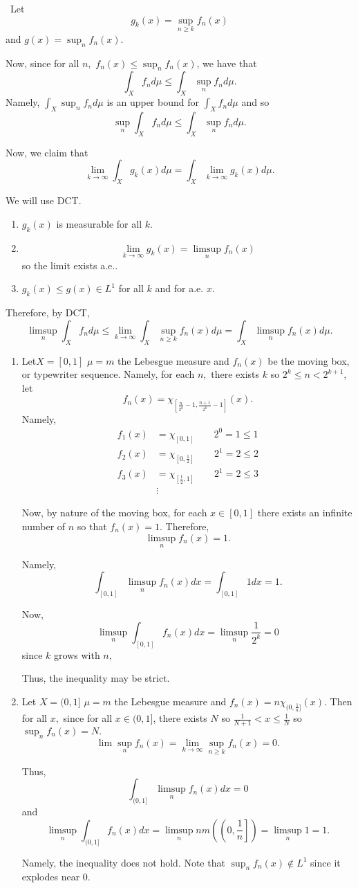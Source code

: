 \documentclass[12pt]{Qual}
\begin{document}
\begin{solution}$\,$
Let $$g_k(x)=\sup_{n\ge k}f_n(x)$$ and $g(x)=\sup_nf_n(x)$.

Now, since for all $n,$ $f_n(x)\le\sup_nf_n(x)$, we have that $$\int_Xf_nd\mu\le\int_X\sup_nf_nd\mu.$$ Namely, $\displaystyle \int_X\sup_nf_nd\mu$ is an upper bound for $\displaystyle \int_Xf_nd\mu$ and so $$\sup_n\int_Xf_nd\mu\le \int_X\sup_nf_nd\mu.$$

Now, we claim that $$\lim_{k\to\infty}\int_Xg_k(x)d\mu=\int_X\lim_{k\to\infty}g_k(x)d\mu.$$

We will use DCT. \begin{enumerate}
    \item $g_k(x)$ is measurable for all $k.$
    \item $$\lim_{k\to\infty}g_k(x)=\limsup_nf_n(x)$$ so the limit exists a.e..
    \item $g_k(x)\le g(x)\in L^1$ for all $k$ and for a.e. $x$.
\end{enumerate}

Therefore, by DCT, $$\limsup_n\int_Xf_nd\mu\le\lim_{k\to\infty}\int_X\sup_{n\ge k}f_n(x)d\mu=\int_X\limsup_nf_n(x)d\mu.$$

\begin{enumerate}[label=(\alph*)]
    \item Let$X=[0,1]$ $\mu=m$ the Lebesgue measure and $f_n(x)$ be the moving box, or typewriter sequence. Namely, for each $n,$ there exists $k$ so $2^k\le n<2^{k+1}$, let $$f_n(x)=\chi_{[\frac{n}{2^k}-1,\frac{n+1}{2^k}-1]}(x).$$ Namely, \begin{align*}
        f_1(x)&=\chi_{[0,1]}\qquad 2^0=1\le 1\\
        f_2(x)&=\chi_{[0,\frac{1}{2}]}\qquad 2^1=2\le 2\\
        f_3(x)&=\chi_{[\frac{1}{2},1]}\qquad 2^1=2\le 3\\
        &\vdots
    \end{align*}

    Now, by nature of the moving box, for each $x\in[0,1]$ there exists an infinite number of $n$ so that $f_n(x)=1$. Therefore, $$\limsup_nf_n(x)=1.$$

    Namely, $$\int_{[0,1]}\limsup_nf_n(x)dx=\int_{[0,1]}1dx=1.$$

    Now, $$\limsup_n\int_{[0,1]}f_n(x)dx=\limsup_n\frac{1}{2^k}=0$$ since $k$ grows with $n,$

    Thus, the inequality may be strict.
    \item Let $X=(0,1]$ $\mu=m$ the Lebesgue measure and $f_n(x)=n\chi_{(0,\frac{1}{n}]}(x)$. Then for all $x,$ since for all $x\in(0,1]$, there exists $N$ so $\frac{1}{N+1}< x\le \frac{1}{N}$ so $\sup_nf_n(x)=N.$ $$\lim\sup_nf_n(x)=\lim_{k\to\infty}\sup_{n\ge k}f_n(x)=0.$$

    Thus, $$\int_{(0,1]}\limsup_nf_n(x)dx=0$$ and $$\limsup_n\int_{(0,1]}f_n(x)dx=\limsup_nnm\left(\left(0,\frac{1}{n}\right]\right)=\limsup_n1=1.$$

    Namely, the inequality does not hold. Note that $\sup_nf_n(x)\notin L^1$ since it explodes near $0$.
\end{enumerate}
\end{solution}
\vspace{0.5cm}
\end{document}
